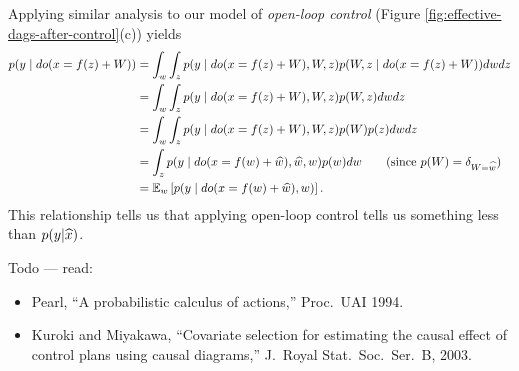 Applying similar analysis to our model of \emph{open-loop control} (Figure \ref{fig:effective-dags-after-control}(c)) yields
\begin{align}
    p(y \mid do(x = f(z) + W)) &= \int_w \int_z p(y \mid do(x = f(z) + W), W, z) p(W, z \mid do(x=f(z)+W)) dw dz \\
    &= \int_w \int_z p(y \mid do(x = f(z) + W), W, z) p(W, z) dw dz \\
    &= \int_w \int_z p(y \mid do(x = f(z) + W), W, z) p(W) p(z) dw dz \\
    &= \int_z p(y \mid do(x = f(w) + \widehat{w}), \widehat{w}, w) p(w) dw \qquad \text{(since $p(W) = \delta_{W=\widehat{w}}$)} \\
    &= \mathbb{E}_w \left[ p(y \mid do(x=f(w)+\widehat{w}), w) \right].
\end{align}
This relationship tells us that applying open-loop control tells us something less than $p(y \vert \widehat{x})$.

Todo --- read:
\begin{itemize}
    \item Pearl, ``A probabilistic calculus of actions,'' Proc.\ UAI 1994.
    \item Kuroki and Miyakawa, ``Covariate selection for estimating the causal effect of control plans using causal diagrams,'' J.\ Royal Stat.\ Soc.\ Ser.\ B, 2003.
\end{itemize}